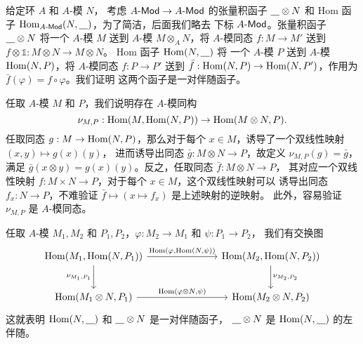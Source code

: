 给定环 $A$ 和 $A$-模 $N$，
考虑 $\text{$A$-\textsf{Mod}}\to \text{$A$-\textsf{Mod}}$ 的张量积函子 $\uline\otimes N$
和 Hom 函子 $\Hom_{\text{$A$-\textsf{Mod}}}(N,\uline)$，为了简洁，后面我们略去
下标 $\text{$A$-\textsf{Mod}}$。张量积函子 $\uline\otimes N$ 将一个 $A$-模 $M$
送到 $A$-模 $M\otimes_A N$，将 $A$-模同态 $f:M\to M'$ 送到 $f\otimes \mathbb{1}:M\otimes N\to M\otimes N$。
Hom 函子 $\Hom(N,\uline)$ 将 一个 $A$-模 $P$ 送到 $A$-模 $\operatorname{Hom}(N,P)$，将 $A$-模同态 $f:P\to P'$ 送到
$\bar f:\operatorname{Hom}(N,P)\to\operatorname{Hom}(N,P')$，作用为 $\bar f(\varphi)=f\circ \varphi$。我们证明
这两个函子是一对伴随函子。

任取 $A$-模 $M$ 和 $P$，我们说明存在 $A$-模同构
\begin{equation}\label{eq:hom isomorphism}
  \nu_{M,P}: \operatorname{Hom}(M,\operatorname{Hom}(N,P))\to \operatorname{Hom}(M\otimes N,P).
\end{equation}
任取同态 $g:M\to \operatorname{Hom}(N,P)$，那么对于每个 $x\in M$，诱导了一个双线性映射 $(x,y)\mapsto g(x)(y)$，
进而诱导出同态 $\bar g:M\otimes N\to P$，故定义 $\nu_{M,P}(g)=\bar g$，满足
$\bar g(x\otimes y)=g(x)(y)$。反之，任取同态 $\bar f:M\otimes N\to P$，
其对应一个双线性映射 $f:M\times N\to P$，对于每个 $x\in M$，这个双线性映射可以
诱导出同态 $f_x:N\to P$，不难验证 $\bar f\mapsto (x\mapsto f_x)$ 是上述映射的逆映射。
此外，容易验证 $\nu_{M,P}$ 是 $A$-模同态。

任取 $A$-模 $M_1,M_2$ 和 $P_1,P_2$，$\varphi:M_2\to M_1$ 和 $\psi:P_1\to P_2$，
我们有交换图
\[
  \begin{tikzcd}[row sep=2.4em,column sep=7.2em]
    \Hom(M_1,\Hom(N,P_1))
    \arrow[r,"{\Hom(\varphi,\Hom(N,\psi))}"]
    \arrow[d,"\nu_{M_1,P_1}"']
    & \Hom(M_2,\Hom(N,P_2))
    \arrow[d,"\nu_{M_2,P_2}"]
     \\
    \Hom(M_1\otimes N,P_1)
    \arrow[r,"{\Hom(\varphi\otimes N,\psi)}"] & \Hom(M_2\otimes N,P_2)
  \end{tikzcd}  
\]
这就表明 $\Hom(N,\uline)$ 和  $\uline\otimes N$ 是一对伴随函子，
$\uline\otimes N$ 是 $\Hom(N,\uline)$ 的左伴随。


